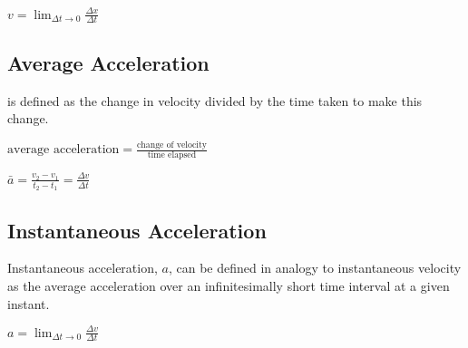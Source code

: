 \documentclass{extarticle}
\begin{document}
$v = \lim_{\Delta t \to 0} \frac{\Delta x}{\Delta t}$

\subsection{Average Acceleration}
is defined as the change in velocity divided by the time taken to make this change.

$\text{average acceleration} = \frac{\text{change of velocity}}{\text{time elapsed}}$

$\bar{a} = \frac{v_2 - v_1}{t_2 - t_1} = \frac{\Delta v}{\Delta t}$

\subsection{Instantaneous Acceleration}
Instantaneous acceleration, $a$, can be defined in analogy to instantaneous
velocity as the average acceleration over an infinitesimally short time interval at
a given instant.

$a = \lim_{\Delta t \to 0} \frac{\Delta v}{\Delta t}$
\end{document}
